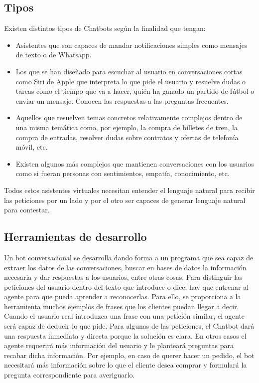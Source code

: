 \subsection{Tipos}

Existen distintos tipos de Chatbots según la finalidad que tengan:
\begin{itemize}
	\item Asistentes que son capaces de mandar notificaciones simples como mensajes de texto o de Whatsapp. 
	\item Los que se han diseñado para escuchar al usuario en conversaciones cortas como Siri de Apple que interpreta lo que pide el usuario y resuelve dudas o tareas como el tiempo que va a hacer, quién ha ganado un partido de fútbol o enviar un mensaje. Conocen las respuestas a las preguntas frecuentes.
	\item Aquellos que resuelven temas concretos relativamente complejos dentro de una misma temática como, por ejemplo, la compra de billetes de tren, la compra de entradas, resolver dudas sobre contratos y ofertas de telefonía móvil, etc.
	\item Existen algunos más complejos que mantienen conversaciones con los usuarios como si fueran personas con sentimientos, empatía, conocimiento, etc.
\end{itemize}

Todos estos asistentes virtuales necesitan entender el lenguaje natural para recibir las peticiones por un lado y por el otro ser capaces de generar lenguaje natural para contestar. 


\subsection{Herramientas de desarrollo}

Un bot conversacional se desarrolla dando forma a un programa que sea capaz de extraer los datos de las conversaciones, buscar en bases de datos la información necesaria y dar respuestas a los usuarios, entre otras cosas. Para distinguir las peticiones del usuario dentro del texto que introduce o dice, hay que entrenar al agente para que pueda aprender a reconocerlas. Para ello, se proporciona a la herramienta muchos ejemplos de frases que los clientes puedan llegar a decir. Cuando el usuario real introduzca una frase con una petición similar, el agente será capaz de deducir lo que pide. Para algunas de las peticiones, el Chatbot dará una respuesta inmediata y directa porque la solución es clara. En otros casos el agente requerirá más información del usuario y le planteará preguntas para recabar dicha información. Por ejemplo, en caso de querer hacer un pedido, el bot necesitará más información sobre lo que el cliente desea comprar y formulará la pregunta correspondiente para averiguarlo.

